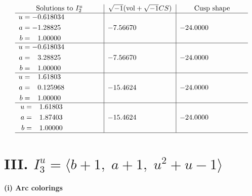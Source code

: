 \documentclass[1p]{elsarticle_modified}
\theoremstyle{definition}
\newcommand{\I}{\sqrt{-1}}
\begin{document}
$$\begin{array}{c|c|c}  
\text{Solutions to }I^u_{2}& \I (\text{vol} + \sqrt{-1}CS) & \text{Cusp shape}\\
 \hline 
\begin{aligned}
u &= -0.618034\phantom{ +0.000000I} \\
a &= -1.28825\phantom{ +0.000000I} \\
b &= \phantom{-}1.00000\phantom{ +0.000000I}\end{aligned}
 & -7.56670\phantom{ +0.000000I} & -24.0000\phantom{ +0.000000I} \\ \hline\begin{aligned}
u &= -0.618034\phantom{ +0.000000I} \\
a &= \phantom{-}3.28825\phantom{ +0.000000I} \\
b &= \phantom{-}1.00000\phantom{ +0.000000I}\end{aligned}
 & -7.56670\phantom{ +0.000000I} & -24.0000\phantom{ +0.000000I} \\ \hline\begin{aligned}
u &= \phantom{-}1.61803\phantom{ +0.000000I} \\
a &= \phantom{-}0.125968\phantom{ +0.000000I} \\
b &= \phantom{-}1.00000\phantom{ +0.000000I}\end{aligned}
 & -15.4624\phantom{ +0.000000I} & -24.0000\phantom{ +0.000000I} \\ \hline\begin{aligned}
u &= \phantom{-}1.61803\phantom{ +0.000000I} \\
a &= \phantom{-}1.87403\phantom{ +0.000000I} \\
b &= \phantom{-}1.00000\phantom{ +0.000000I}\end{aligned}
 & -15.4624\phantom{ +0.000000I} & -24.0000\phantom{ +0.000000I}\\
 \hline 
 \end{array}$$\newpage\newpage\renewcommand{\arraystretch}{1}
\centering \section*{III. $I^u_{3}= \langle b+1,\;a+1,\;u^2+u-1 \rangle$}
\flushleft \textbf{(i) Arc colorings}\\
\end{document}
